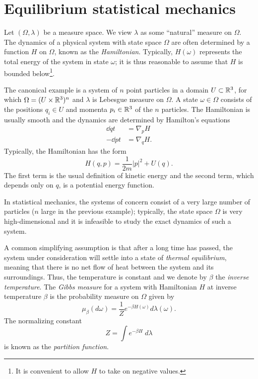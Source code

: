 
\section{Equilibrium statistical mechanics}
\label{sec:gibbs}

Let $(\Omega, \lambda)$ be a measure space. We view $\lambda$ as some ``natural''
measure on $\Omega$. The dynamics of a physical system with state space $\Omega$
are often determined by a function $H$ on $\Omega$, known as the \emph{Hamiltonian}.
Typically, $H(\omega)$ represents the total energy of the system in state $\omega$;
it is thus reasonable to assume that $H$ is bounded below\footnote{It is convenient
to allow $H$ to take on negative values.}.

\begin{example}
\label{ex:hamilton}
The canonical example is a system of $n$ point particles in a domain $U \subset {\mathbb R}^3$,
for which $\Omega = (U \times {\mathbb R}^3)^n$ and $\lambda$ is Lebesgue measure on $\Omega$.
A state $\omega\in\Omega$ consists of the positions $q_i \in U$ and momenta $p_i \in {\mathbb R}^3$
of the $n$ particles. The Hamiltonian is usually smooth and the dynamics are determined
by Hamilton's equations
\begin{align}
\dd{q}{t} 	&= \nabla_p H \\
-\dd{p}{t} 	&= \nabla_q H.
\end{align}
Typically, the Hamiltonian has the form
\begin{equation}
\label{e:total-energy}
H(q, p) = \frac{1}{2m} |p|^2 + U(q).
\end{equation}
The first term is the usual definition of kinetic energy and the second term, which
depends only on $q$, is a potential energy function.
\end{example}

In statistical mechanics, the systems of concern consist of a very large number
of particles ($n$ large in the previous example); typically, the state space $\Omega$ is very
high-dimensional and it is infeasible to study the exact dynamics of such a system.

A common simplifying assumption is that after a long time has passed, the system
under consideration will settle into a state of \emph{thermal equilibrium}, meaning
that there is no net flow of heat between the system and its surroundings. Thus,
the temperature is constant and we denote by $\beta$ the \emph{inverse temperature}.
The \emph{Gibbs measure} \cite{Gibbs60} for a system with Hamiltonian $H$ at inverse temperature
$\beta$ is the probability measure on $\Omega$ given by
\begin{equation}
\label{e:gibbs-def}
\mu_\beta(d\omega) = \frac{1}{Z} e^{-\beta H(\omega)} d\lambda(\omega).
\end{equation}
The normalizing constant
\begin{equation}
Z = \int e^{-\beta H} \; d\lambda
\end{equation}
is known as the \emph{partition function}.

